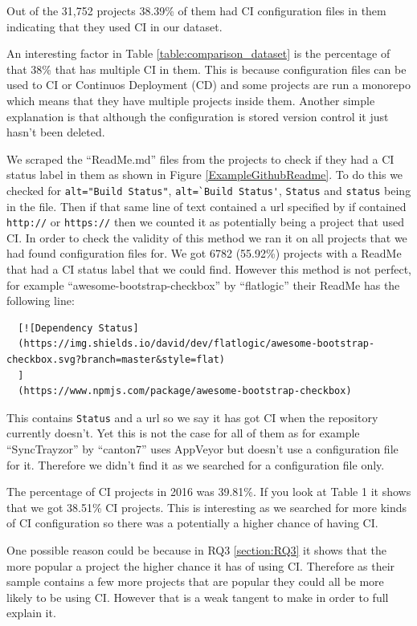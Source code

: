 \documentclass[10pt,conference]{IEEEtran}
\begin{document}
Out of the 31,752 projects 38.39\% of them had CI configuration files in them indicating that they used CI in our dataset. 


An interesting factor in Table \ref{table:comparison_dataset} is the percentage of that 38\% that has multiple CI in them. This is because configuration files can be used to CI or Continuos Deployment (CD) and some projects are run a monorepo which means that they have multiple projects inside them. Another simple explanation is that although the configuration is stored version control it just hasn't been deleted. 

We scraped the \enquote{ReadMe.md} files from the projects to check if they had a CI status label in them as shown in Figure \ref{ExampleGithubReadme}. To do this we checked for \verb|alt="Build Status"|, \verb|alt=`Build Status'|, \verb|Status| and \verb|status| being in the file. Then if that same line of text contained a url specified by if contained \verb|http://| or \verb|https://| then we counted it as potentially being a project that used CI. In order to check the validity of this method we ran it on all projects that we had found configuration files for. We got 6782 (55.92\%) projects with a ReadMe that had a CI status label that we could find.
However this method is not perfect, for example \enquote{awesome-bootstrap-checkbox} by \enquote{flatlogic} \cite{GithubReadMeIncorrectFind} their ReadMe has the following line:
\begin{verbatim}
  [![Dependency Status]
  (https://img.shields.io/david/dev/flatlogic/awesome-bootstrap-checkbox.svg?branch=master&style=flat)
  ]
  (https://www.npmjs.com/package/awesome-bootstrap-checkbox) 
\end{verbatim}
This contains \verb|Status| and a url so we say it has got CI when the repository currently doesn't. Yet this is not the case for all of them as for example \enquote{SyncTrayzor} by \enquote{canton7} \cite{Male2020} uses AppVeyor but doesn't use a configuration file for it. Therefore we didn't find it as we searched for a configuration file only. 

The percentage of CI projects in 2016 was 39.81\%. If you look at Table 1 it shows that we got 38.51\% CI projects. This is interesting as we searched for more kinds of CI configuration so there was a potentially a higher chance of having CI.

One possible reason could be because in RQ3 \ref{section:RQ3} it shows that the more popular a project the higher chance it has of using CI. Therefore as their sample contains a few more projects that are popular they could all be more likely to be using CI. However that is a weak tangent to make in order to full explain it.  
\end{document}

